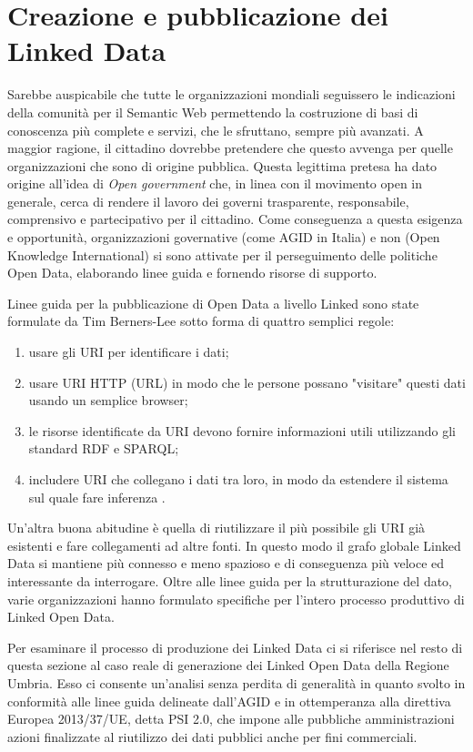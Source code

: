 \section{Creazione e pubblicazione dei Linked Data}
\label{sec:intro:linked_data_production}

Sarebbe auspicabile che tutte le organizzazioni mondiali seguissero le indicazioni della comunità per il Semantic Web permettendo la costruzione di basi di conoscenza più complete e servizi, che le sfruttano, sempre più avanzati. A maggior ragione, il cittadino dovrebbe pretendere che questo avvenga per quelle organizzazioni che sono di origine pubblica. Questa legittima pretesa ha dato origine all'idea di \textit{Open government} che, in linea con il movimento open in generale, cerca di rendere il lavoro dei governi trasparente, responsabile, comprensivo e partecipativo per il cittadino. Come conseguenza a questa esigenza e opportunità, organizzazioni governative (come AGID in Italia) e non (Open Knowledge International) si sono attivate per il perseguimento delle politiche Open Data, elaborando linee guida e fornendo risorse di supporto.

Linee guida per la pubblicazione di Open Data a livello Linked sono state formulate da Tim Berners-Lee\cite{5_star_open_data} sotto forma di quattro semplici regole:
\begin{enumerate}
\item usare gli URI per identificare i dati;
\item usare URI HTTP (URL) in modo che le persone possano "visitare" questi dati usando un semplice browser;
\item le risorse identificate da URI devono fornire informazioni utili utilizzando gli standard RDF e SPARQL;
\item includere URI che collegano i dati tra loro, in modo da estendere il sistema sul quale fare inferenza \label{sec:intro:link_discovery}.
\end{enumerate}

Un'altra buona abitudine è quella di riutilizzare il più possibile gli URI già esistenti e fare collegamenti ad altre fonti. In questo modo il grafo globale Linked Data si mantiene più connesso e meno spazioso e di conseguenza più veloce ed interessante da interrogare.
Oltre alle linee guida per la strutturazione del dato, varie organizzazioni hanno formulato specifiche per l'intero processo produttivo di Linked Open Data.

Per esaminare il processo di produzione dei Linked Data ci si riferisce nel resto di questa sezione al caso reale di generazione dei Linked Open Data della Regione Umbria. Esso ci consente un'analisi senza perdita di generalità in quanto svolto in conformità alle linee guida delineate dall'AGID  e in ottemperanza alla direttiva Europea 2013/37/UE, detta PSI 2.0, che impone alle pubbliche amministrazioni azioni finalizzate al riutilizzo dei dati pubblici anche per fini commerciali. 

